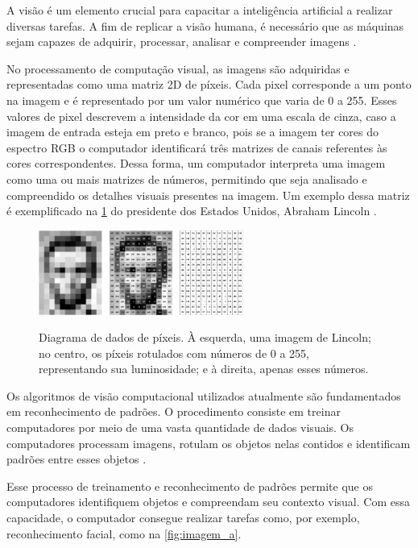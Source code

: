 A visão é um elemento crucial para capacitar a inteligência artificial a realizar diversas tarefas. A fim de replicar a visão humana, é necessário que as máquinas sejam capazes de adquirir, processar, analisar e compreender imagens \cite{como_funciona_visao_computacional}.

No processamento de computação visual, as imagens são adquiridas e representadas como uma matriz 2D de píxeis. Cada pixel corresponde a um ponto na imagem e é representado por um valor numérico que varia de 0 a 255. Esses valores de pixel descrevem a intensidade da cor em uma escala de cinza, caso a imagem de entrada esteja em preto e branco, pois se a imagem ter cores do espectro RGB o computador identificará três matrizes de canais referentes às cores correspondentes. Dessa forma, um computador interpreta uma imagem como uma ou mais matrizes de números, permitindo que seja analisado e compreendido os detalhes visuais presentes na imagem. Um exemplo dessa matriz é exemplificado na \cref{fig:comp_vision} do presidente dos Estados Unidos, Abraham Lincoln \cite{mit_video}.

\begin{figure}[ht]
    \caption{Diagrama de dados de píxeis. À esquerda, uma imagem de Lincoln; no centro, os píxeis rotulados com números de 0 a 255, representando sua luminosidade; e à direita, apenas esses números.}
    \centering
    \includegraphics[width=0.6\textwidth]{figures/lincoln_pixel_values.png}
    \label{fig:comp_vision}
\end{figure}

Os algoritmos de visão computacional utilizados atualmente são fundamentados em reconhecimento de padrões. O procedimento consiste em treinar computadores por meio de uma vasta quantidade de dados visuais. Os computadores processam imagens, rotulam os objetos nelas contidos e identificam padrões entre esses objetos \cite{content_Human_Vision}.

Esse processo de treinamento e reconhecimento de padrões permite que os computadores identifiquem objetos e compreendam seu contexto visual. Com essa capacidade, o computador consegue realizar tarefas como, por exemplo, reconhecimento facial, como na \cref{fig:imagem_a}.

